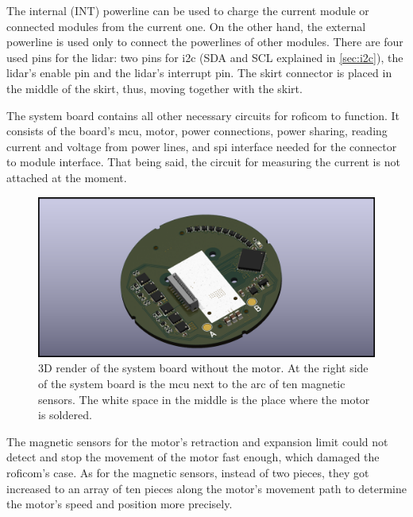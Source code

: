 \documentclass[
  digital,     %
  oneside,     %
  nosansbold,  %
  nocolorbold, %
  nolof,         %
  nolot,         %
]{fithesis4}
\newcommand{\TODO}[1]{\textcolor{red}{\textit{#1}}}
\begin{document}
{{{The internal (INT) powerline can be used to charge the current module or connected modules from the current one. On the other hand, the external powerline is used only to connect the powerlines of other modules. There are four used pins for the \acrshort{lidar}: two pins for \acrshort{i2c} (SDA and SCL explained in \autoref{sec:i2c}), the \acrshort{lidar}'s enable pin and the \acrshort{lidar}'s interrupt pin. The skirt connector is placed in the middle of the skirt, thus, moving together with the skirt.

The system board contains all other necessary circuits for \acrshort{roficom} to function. It consists of the board's \acrfull{mcu}, motor, power connections, power sharing, reading current and voltage from power lines, and \acrshort{spi} interface needed for the connector to module interface. That being said, the circuit for measuring the current is not attached at the moment.

\begin{figure}
    \includegraphics[width=\textwidth,height=\textheight,keepaspectratio]{assets/control_board.png}
    \caption[3D render of the system board]{3D render of the system board without the motor. At the right side of the system board is the \acrshort{mcu} next to the arc of ten magnetic sensors. The white space in the middle is the place where the motor is soldered.}
    \label{fig:roficom-board}
\end{figure}


The magnetic sensors for the motor's retraction and expansion limit could not detect and stop the movement of the motor fast enough, which damaged the \acrshort{roficom}'s case.
As for the magnetic sensors, instead of two pieces, they got increased to an array of ten pieces along the motor's movement path to determine the motor's speed and position more precisely.

}}}
\end{document}
